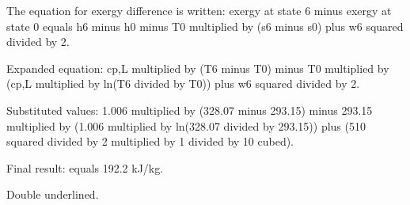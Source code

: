 The equation for exergy difference is written:  
exergy at state 6 minus exergy at state 0 equals h6 minus h0 minus T0 multiplied by (s6 minus s0) plus w6 squared divided by 2.  

Expanded equation:  
cp,L multiplied by (T6 minus T0) minus T0 multiplied by (cp,L multiplied by ln(T6 divided by T0)) plus w6 squared divided by 2.  

Substituted values:  
1.006 multiplied by (328.07 minus 293.15) minus 293.15 multiplied by (1.006 multiplied by ln(328.07 divided by 293.15)) plus (510 squared divided by 2 multiplied by 1 divided by 10 cubed).  

Final result:  
equals 192.2 kJ/kg.  

Double underlined.